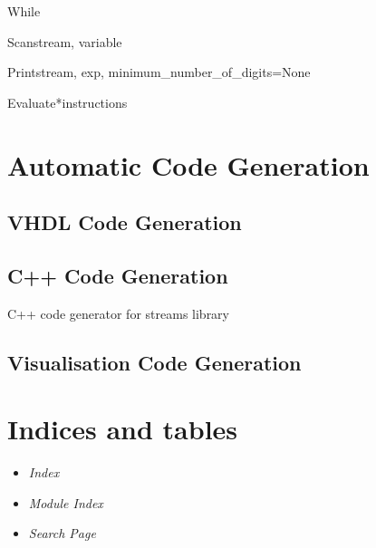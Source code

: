 \documentclass[letterpaper,10pt,english]{manual}
\begin{document}
\hypertarget{chips.While}{}\begin{classdesc}{While}{}\end{classdesc}

\hypertarget{chips.Scan}{}\begin{classdesc}{Scan}{stream, variable}\end{classdesc}

\hypertarget{chips.Print}{}\begin{classdesc}{Print}{stream, exp, minimum\_number\_of\_digits=None}\end{classdesc}

\hypertarget{chips.Evaluate}{}\begin{classdesc}{Evaluate}{*instructions}\end{classdesc}

\resetcurrentobjects
\hypertarget{--doc-automatic\_code\_generation/index}{}

\chapter{Automatic Code Generation}


\section{VHDL Code Generation}


\section{C++ Code Generation}
\hypertarget{module-chips\_cpp}{}
\modulesynopsis{}
C++ code generator for streams library


\section{Visualisation Code Generation}


\chapter{Indices and tables}
\begin{itemize}
\item {} 
\emph{Index}

\item {} 
\emph{Module Index}

\item {} 
\emph{Search Page}

\end{itemize}


\renewcommand{\indexname}{Module Index}
\printmodindex
\renewcommand{\indexname}{Index}
\printindex
\end{document}
